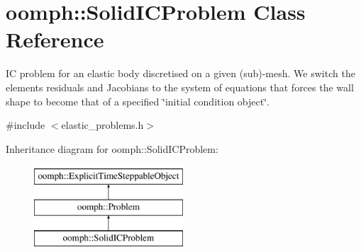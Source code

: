 \hypertarget{classoomph_1_1SolidICProblem}{}\section{oomph\+:\+:Solid\+I\+C\+Problem Class Reference}
\label{classoomph_1_1SolidICProblem}


IC problem for an elastic body discretised on a given (sub)-\/mesh. We switch the elements\textquotesingle{} residuals and Jacobians to the system of equations that forces the wall shape to become that of a specified \char`\"{}initial condition object\char`\"{}.  




{\ttfamily \#include $<$elastic\+\_\+problems.\+h$>$}

Inheritance diagram for oomph\+:\+:Solid\+I\+C\+Problem\+:\begin{figure}[H]
\begin{center}
\leavevmode
\includegraphics[height=3.000000cm]{classoomph_1_1SolidICProblem}
\end{center}
\end{figure}
